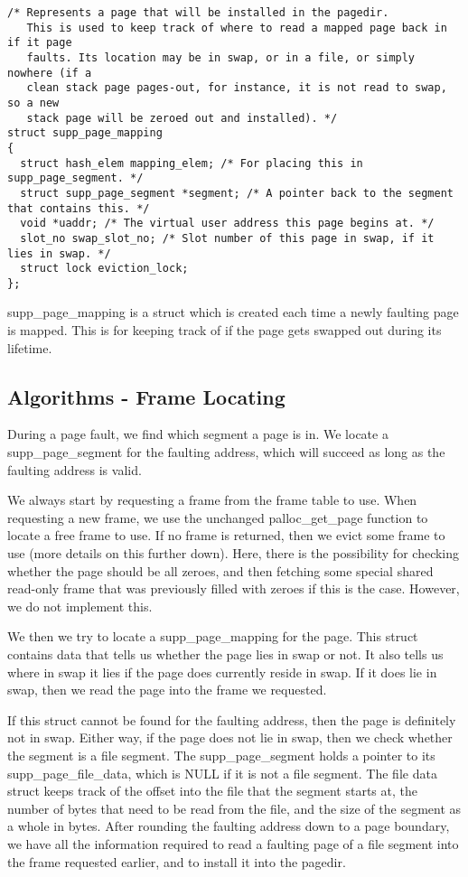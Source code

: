 \begin{verbatim}
/* Represents a page that will be installed in the pagedir.
   This is used to keep track of where to read a mapped page back in if it page
   faults. Its location may be in swap, or in a file, or simply nowhere (if a
   clean stack page pages-out, for instance, it is not read to swap, so a new
   stack page will be zeroed out and installed). */
struct supp_page_mapping
{
  struct hash_elem mapping_elem; /* For placing this in supp_page_segment. */
  struct supp_page_segment *segment; /* A pointer back to the segment that contains this. */
  void *uaddr; /* The virtual user address this page begins at. */
  slot_no swap_slot_no; /* Slot number of this page in swap, if it lies in swap. */
  struct lock eviction_lock;
};
\end{verbatim}

supp\_page\_mapping is a struct which is created each time a newly faulting page
is mapped. This is for keeping track of if the page gets swapped out during its
lifetime.

\subsection{Algorithms - Frame Locating}


During a page fault, we find which segment a page is in. We locate a
supp\_page\_segment for the faulting address, which will succeed as long as the
faulting address is valid.

We always start by requesting a frame from the frame table to use.  When
requesting a new frame, we use the unchanged palloc\_get\_page function to
locate a free frame to use. If no frame is returned, then we evict some frame to
use (more details on this further down). Here, there is the possibility for
checking whether the page should be all zeroes, and then fetching some special
shared read-only frame that was previously filled with zeroes if this is the
case.  However, we do not implement this.

We then we try to locate a supp\_page\_mapping for the page. This struct
contains data that tells us whether the page lies in swap or not. It also tells
us where in swap it lies if the page does currently reside in swap. If it does
lie in swap, then we read the page into the frame we requested.

If this struct cannot be found for the faulting address, then the page is
definitely not in swap. Either way, if the page does not lie in swap, then we
check whether the segment is a file segment. The supp\_page\_segment holds a
pointer to its supp\_page\_file\_data, which is NULL if it is not a file
segment. The file data struct keeps track of the offset into the file that the
segment starts at, the number of bytes that need to be read from the file, and
the size of the segment as a whole in bytes. After rounding the faulting address
down to a page boundary, we have all the information required to read a faulting
page of a file segment into the frame requested earlier, and to install it into
the pagedir.

